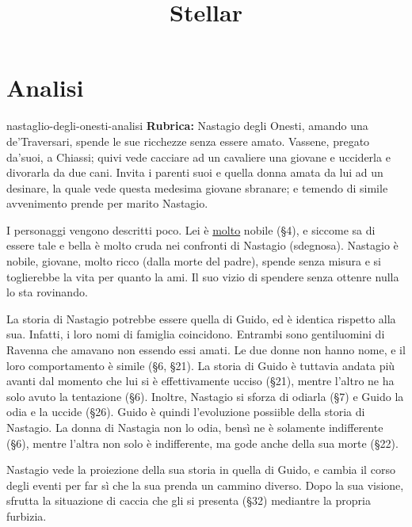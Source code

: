 \documentclass[preview]{standalone}
\begin{document}
\title{Stellar}
\genpage

\section{Analisi}

\begin{snippet}{nastaglio-degli-onesti-analisi}
    \textbf{Rubrica:} Nastagio degli Onesti, amando una de'Traversari,
    spende le sue ricchezze senza essere amato.
    Vassene, pregato da'suoi, a Chiassi; quivi vede cacciare ad un
    cavaliere una giovane e ucciderla e divorarla da due cani.
    Invita i parenti suoi e quella donna amata da lui ad un desinare,
    la quale vede questa medesima giovane sbranare; e temendo di simile avvenimento
    prende per marito Nastagio.
    
    
    I personaggi vengono descritti poco. Lei è \underline{molto} nobile (§4), e siccome sa di essere tale e bella
    è molto cruda nei confronti di Nastagio (sdegnosa). Nastagio è nobile, giovane, molto ricco (dalla morte del padre),
    spende senza misura e si toglierebbe la vita per quanto la ami. Il suo vizio di spendere senza ottenre nulla lo sta rovinando.
    
    La storia di Nastagio potrebbe essere quella di Guido, ed è identica rispetto alla sua.
    Infatti, i loro nomi di famiglia coincidono. Entrambi sono gentiluomini di Ravenna
    che amavano non essendo essi amati.
    Le due donne non hanno nome, e il loro comportamento è simile (§6, §21).
    La storia di Guido è tuttavia andata più avanti dal momento che lui si è effettivamente ucciso (§21), 
    mentre l'altro ne ha solo avuto la tentazione (§6).
    Inoltre, Nastagio si sforza di odiarla (§7) e Guido la odia e la uccide (§26).
    Guido è quindi l'evoluzione possiible della storia di Nastagio.
    La donna di Nastagia non lo odia, bensì ne è solamente indifferente (§6), mentre l'altra
    non solo è indifferente, ma gode anche della sua morte (§22).
    
    Nastagio vede la proiezione della sua storia in quella di Guido, e cambia il corso degli eventi per far sì che
    la sua prenda un cammino diverso.
    Dopo la sua visione, sfrutta la situazione di caccia che gli si presenta (§32) mediantre la propria furbizia.
    

\end{snippet}
\end{document}
